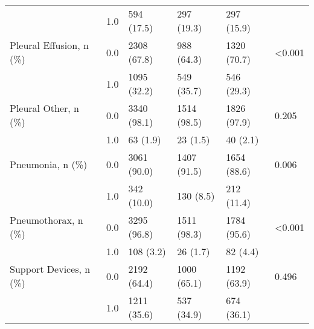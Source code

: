\begin{tabular}{llllll}
                       & 1.0 &        594 (17.5) &   297 (19.3) &   297 (15.9) &         \\
Pleural Effusion, n (\%) & 0.0 &       2308 (67.8) &   988 (64.3) &  1320 (70.7) &  <0.001 \\
                       & 1.0 &       1095 (32.2) &   549 (35.7) &   546 (29.3) &         \\
Pleural Other, n (\%) & 0.0 &       3340 (98.1) &  1514 (98.5) &  1826 (97.9) &   0.205 \\
                       & 1.0 &          63 (1.9) &     23 (1.5) &     40 (2.1) &         \\
Pneumonia, n (\%) & 0.0 &       3061 (90.0) &  1407 (91.5) &  1654 (88.6) &   0.006 \\
                       & 1.0 &        342 (10.0) &    130 (8.5) &   212 (11.4) &         \\
Pneumothorax, n (\%) & 0.0 &       3295 (96.8) &  1511 (98.3) &  1784 (95.6) &  <0.001 \\
                       & 1.0 &         108 (3.2) &     26 (1.7) &     82 (4.4) &         \\
Support Devices, n (\%) & 0.0 &       2192 (64.4) &  1000 (65.1) &  1192 (63.9) &   0.496 \\
                       & 1.0 &       1211 (35.6) &   537 (34.9) &   674 (36.1) &         \\
\bottomrule
\end{tabular}
